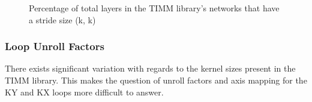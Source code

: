 \begin{figure}
    \centering
    \caption{Percentage of total layers in the TIMM library's networks that have a stride size (k, k)}
    \label{fig:kernel_stats:strides}
\end{figure}



\subsubsection{Loop Unroll Factors}
\label{chap:dda:dataflow_dse:pruning:applying_it:loop_unroll_factors}

There exists significant variation with regards to the kernel sizes present in
the TIMM library. This makes the question of unroll factors and axis mapping for
the KY and KX loops more difficult to answer.

